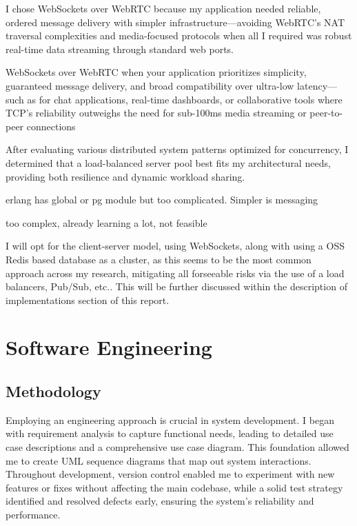 \documentclass[]{final}
\begin{document}
I chose WebSockets over WebRTC because my application needed reliable, ordered
message delivery with simpler infrastructure—avoiding WebRTC’s NAT traversal
complexities and media-focused protocols when all I required was robust
real-time data streaming through standard web ports.

WebSockets over WebRTC when your application prioritizes simplicity, guaranteed
message delivery, and broad compatibility over ultra-low latency—such as for
chat applications, real-time dashboards, or collaborative tools where TCP’s
reliability outweighs the need for sub-100ms media streaming or peer-to-peer
connections

After
evaluating various distributed system patterns optimized for concurrency,
I determined that a load-balanced server pool best fits my architectural
needs, providing both resilience and dynamic workload sharing.

erlang has global or pg module but too complicated. Simpler is messaging

too complex, already learning a lot, not feasible


I will opt for the client-server model, using WebSockets, along with using a OSS Redis based database as a cluster,
as this seems to be the most common approach
across my research, mitigating all forseeable risks via the use of a load balancers,
Pub/Sub, etc.. This will be further discussed within the description of implementations section of this report.

\chapter{Software Engineering}

\section{Methodology}
Employing an engineering approach is crucial in system development. I began with
requirement analysis to capture functional needs, leading to detailed use case
descriptions and a comprehensive use case diagram. This foundation allowed me to
create UML sequence diagrams that map out system interactions. Throughout development,
version control enabled me to experiment with new features or fixes without
affecting the main codebase, while a solid test strategy identified and resolved
defects early, ensuring the system's reliability and performance.
\end{document}
